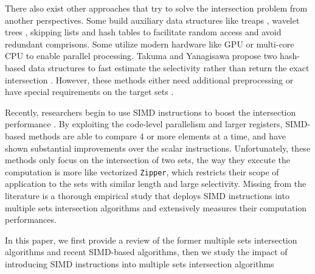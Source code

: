\documentclass[runningheads,a4paper]{llncs}
\begin{document}
There also exist other approaches that try to solve the intersection problem from another perspectives.
Some build auxiliary data structures like treaps \cite{Blelloch1998Fast,chen2016efficient}, wavelet trees \cite{navarro2010dual}, skipping lists \cite{Culpepper2007Compact,Moffat1996Self} and hash tables \cite{Arroyuelo2010Compressed,Sanders2007Intersection,Ding2011Fast} to facilitate random access and avoid redundant comprisons.
Some utilize modern hardware like GPU \cite{Ao2011Efficient,Wu2009A,Wu2010Efficient} or multi-core CPU \cite{Tatikonda2009On,tsirogiannis2009improving} to enable parallel processing.
Takuma and Yanagisawa propose two hash-based data structures to fast estimate the selectivity rather than return the exact intersection \cite{Takuma2013Faster}.
However, these methods either need additional preprocessing or have special requirements on the target sets \cite{Inoue2014Faster}.

Recently, researchers begin to use SIMD instructions to boost the intersection performance \cite{Inoue2014Faster,Schlegel2011Fast,lemire2016simd}.
By exploiting the code-level parallelism and larger registers, SIMD-based methods are able to compare 4 or more elements at a time, and have shown substantial improvements over the scalar instructions.
Unfortunately, these methods only focus on the intersection of two sets, the way they execute the computation is more like vectorized \texttt{Zipper}, which restricts their scope of application to the sets with similar length and large selectivity.
Missing from the literature is a thorough empirical study that deploys SIMD instructions into multiple sets intersection algorithms and extensively measures their computation performances.

In this paper, we first provide a review of the former multiple sets intersection algorithms and recent SIMD-based algorithms, then we study the impact of introducing SIMD instructions into multiple sets intersection algorithms
 
\end{document}
